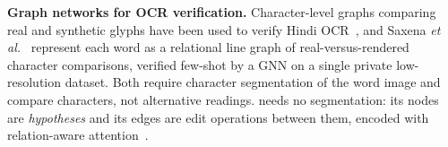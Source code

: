 \textbf{Graph networks for OCR verification.} Character-level graphs comparing real and synthetic glyphs have been
used to verify Hindi OCR~\cite{dubey2025hindi}, and Saxena \emph{et al.}~\cite{saxena2026reading} represent each word as
a relational line graph of real-versus-rendered character comparisons, verified few-shot by a GNN on a single private
low-resolution dataset. Both require character segmentation of the word image and compare characters, not
alternative readings. \ours{}
needs no segmentation: its nodes are \emph{hypotheses} and its edges are edit operations between them, encoded with
relation-aware attention~\cite{brody2022gatv2}.
